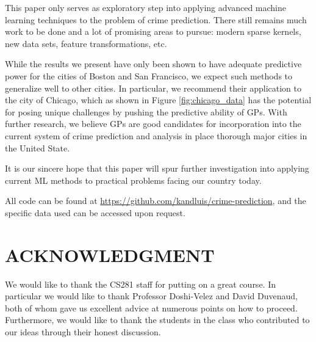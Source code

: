 \documentclass[letterpaper, 11 pt, conference]{ieeeconf}  %
\begin{document}
This paper only serves as exploratory step into applying advanced machine learning techniques to the problem of crime prediction. There still remains much work to be done and a lot of promising areas to pursue: modern sparse kernels, new data sets, feature transformations, etc. 

While the results we present have only been shown to have adequate predictive power for the cities of Boston and San Francisco, we expect such methods to generalize well to other cities. In particular, we recommend their application to the city of Chicago, which as shown in Figure \ref{fig:chicago_data} has the potential for posing unique challenges by pushing the predictive ability of GPs. With further research, we believe GPs are good candidates for incorporation into the current system of crime prediction and analysis in place thorough major cities in the United State. 

It is our sincere hope that this paper will spur further investigation into applying current ML methods to practical problems facing our country today. 

All code can be found at \url{https://github.com/kandluis/crime-prediction}, and the specific data used can be accessed upon request. 

\addtolength{\textheight}{-12cm}   %








\section*{ACKNOWLEDGMENT}

We would like to thank the CS281 staff for putting on a great course. In particular we would like to thank Professor Doshi-Velez and David Duvenaud, both of whom gave us excellent advice at numerous points on how to proceed. Furthermore, we would like to thank the students in the class who contributed to our ideas through their honest discussion.






\end{document}
